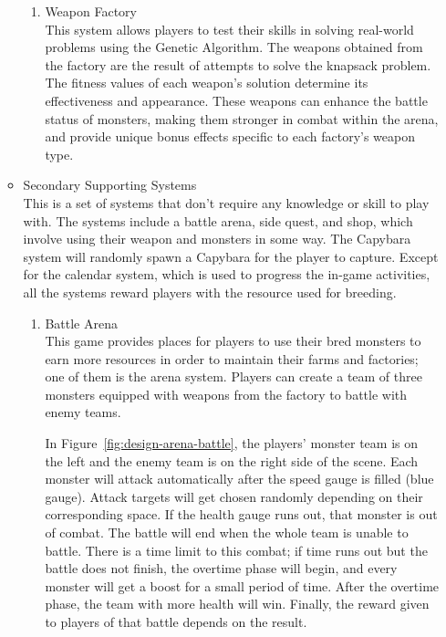 \documentclass[12pt,oneside,openright,a4paper]{cpe-english-project}
\begin{document}
\begin{itemize}
\begin{itemize}
\begin{enumerate}
		\item Weapon Factory \\
		This system allows players to test their skills in solving real-world problems using the Genetic Algorithm. The weapons obtained from the factory are the result of attempts to solve the knapsack problem. The fitness values of each weapon's solution determine its effectiveness and appearance. These weapons can enhance the battle status of monsters, making them stronger in combat within the arena, and provide unique bonus effects specific to each factory's weapon type.
		\end{enumerate}
	
	\item Secondary Supporting Systems \\
	This is a set of systems that don't require any knowledge or skill to play with. The systems include a battle arena, side quest, and shop, which involve using their weapon and monsters in some way. The Capybara system will randomly spawn a Capybara for the player to capture. Except for the calendar system, which is used to progress the in-game activities, all the systems reward players with the resource used for breeding.

		\begin{enumerate}
		\item Battle Arena \\
		This game provides places for players to use their bred monsters to earn more resources in order to maintain their farms and factories; one of them is the arena system. Players can create a team of three monsters equipped with weapons from the factory to battle with enemy teams. \\
		\begin{minipage}[c]{\textwidth}\centering
		\label{fig:design-arena-battle}
		\end{minipage}
		In Figure~\ref{fig:design-arena-battle}, the players' monster team is on the left and the enemy team is on the right side of the scene. Each monster will attack automatically after the speed gauge is filled (blue gauge). Attack targets will get chosen randomly depending on their corresponding space. If the health gauge runs out, that monster is out of combat. The battle will end when the whole team is unable to battle. There is a time limit to this combat; if time runs out but the battle does not finish, the overtime phase will begin, and every monster will get a boost for a small period of time. After the overtime phase, the team with more health will win. Finally, the reward given to players of that battle depends on the result.
	

\end{enumerate}
\end{itemize}
\end{itemize}
\end{document}
